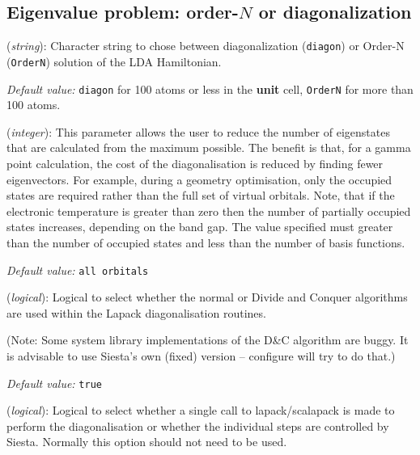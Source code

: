 \documentclass[11pt]{article}
\begin{document}
\vspace{5pt}
\subsection{Eigenvalue problem: order-$N$ or diagonalization}

\begin{description}
\itemsep 10pt
\parsep 0pt

\item[{\bf SolutionMethod}] ({\it string}): 
Character string to chose between
diagonalization ({\tt diagon}) or Order-N ({\tt OrderN}) solution
of the LDA Hamiltonian.

{\it Default value:} {\tt diagon} for 100 atoms or less in the 
{\bf unit} cell, {\tt OrderN} for more than 100 atoms.


\item[{\bf NumberOfEigenStates}] ({\it integer}): 
This parameter allows the user to reduce the number of eigenstates
that are calculated from the maximum possible. The benefit is that,
for a gamma point calculation, the cost of the diagonalisation is
reduced by finding fewer eigenvectors. For example, during a geometry
optimisation, only the occupied states are required rather than the
full set of virtual orbitals. Note, that if the electronic temperature
is greater than zero then the number of partially occupied states
increases, depending on the band gap.
The value specified must greater than the number of occupied states
and less than the number of basis functions.

{\it Default value:} {\tt all orbitals}

\item[{\bf Diag.DivideAndConquer}] ({\it logical}): 
Logical to select whether the normal or Divide and Conquer algorithms are
used within the Lapack diagonalisation routines. 

(Note: Some system library implementations of the D\&C algorithm are
buggy. It is advisable to use Siesta's own (fixed) version -- configure will
try to do that.)

{\it Default value:} {\tt true}

\item[{\bf Diag.AllInOne}] ({\it logical}): 
Logical to select whether a single call to lapack/scalapack is made to 
perform the diagonalisation or whether the individual steps are controlled
by {\sc Siesta}. Normally this option should not need to be used.


\end{description}
\end{document}
